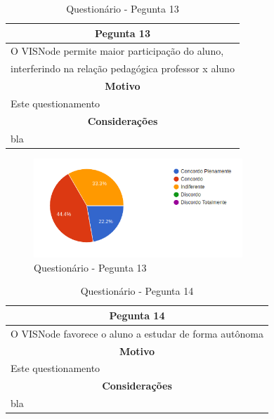 \documentclass[
	12pt,				%
	oneside,			%
	a4paper,			%
	english,			%
	french,				%
	spanish,			%
	brazil,				%
	]{abntex2}
\begin{document}
\begin{table}[H]
\centering
\caption{Questionário - Pegunta 13} 
\def\arraystretch{1.5}
\begin{tabular}{l}
\hline
\multicolumn{1}{c}{\textbf{Pegunta 13}}              \\ \hline
O VISNode permite maior participação do aluno, \\ interferindo na relação pedagógica professor x aluno \\ \hline
\multicolumn{1}{c}{\textbf{Motivo}}                 \\ \hline
Este questionamento                                   \\ \hline
\multicolumn{1}{c}{\textbf{Considerações}}          \\ \hline
bla                                                   \\ \hline
\end{tabular}
\sourceAuthor
\end{table}

\begin{figure}[H]
\centering
\caption{Questionário - Pegunta 13}
\includegraphics[width=0.7\textwidth]{imagens/v1/p13.png}
\sourceAuthor
\end{figure}

\begin{table}[H]
\centering
\caption{Questionário - Pegunta 14} 
\def\arraystretch{1.5}
\begin{tabular}{l}
\hline
\multicolumn{1}{c}{\textbf{Pegunta 14}}              \\ \hline
O VISNode favorece o aluno a estudar de forma autônoma \\ \hline
\multicolumn{1}{c}{\textbf{Motivo}}                 \\ \hline
Este questionamento                                   \\ \hline
\multicolumn{1}{c}{\textbf{Considerações}}          \\ \hline
bla                                                   \\ \hline
\end{tabular}
\sourceAuthor
\end{table}
\end{document}

